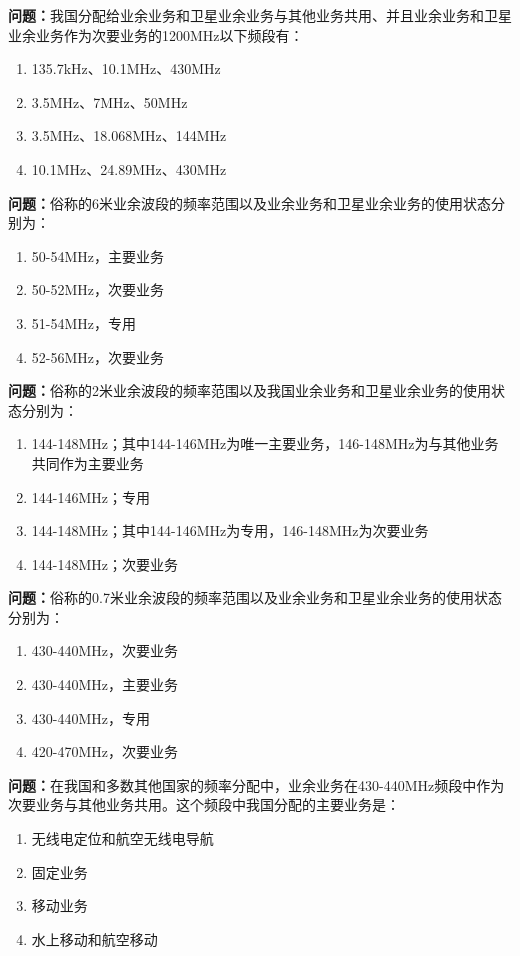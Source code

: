 \documentclass[UTF8]{ctexbook}
\begin{document}
\textbf{问题：}我国分配给业余业务和卫星业余业务与其他业务共用、并且业余业务和卫星业余业务作为次要业务的1200MHz以下频段有：
\begin{enumerate}[label=\Alph*), leftmargin=3em]
  \item 135.7kHz、10.1MHz、430MHz
  \item 3.5MHz、7MHz、50MHz
  \item 3.5MHz、18.068MHz、144MHz
  \item 10.1MHz、24.89MHz、430MHz
\end{enumerate}

\textbf{问题：}俗称的6米业余波段的频率范围以及业余业务和卫星业余业务的使用状态分别为：
\begin{enumerate}[label=\Alph*), leftmargin=3em]
  \item 50-54MHz，主要业务
  \item 50-52MHz，次要业务
  \item 51-54MHz，专用
  \item 52-56MHz，次要业务
\end{enumerate}

\textbf{问题：}俗称的2米业余波段的频率范围以及我国业余业务和卫星业余业务的使用状态分别为：
\begin{enumerate}[label=\Alph*), leftmargin=3em]
  \item 144-148MHz；其中144-146MHz为唯一主要业务，146-148MHz为与其他业务共同作为主要业务
  \item 144-146MHz；专用
  \item 144-148MHz；其中144-146MHz为专用，146-148MHz为次要业务
  \item 144-148MHz；次要业务
\end{enumerate}

\textbf{问题：}俗称的0.7米业余波段的频率范围以及业余业务和卫星业余业务的使用状态分别为：
\begin{enumerate}[label=\Alph*), leftmargin=3em]
  \item 430-440MHz，次要业务
  \item 430-440MHz，主要业务
  \item 430-440MHz，专用
  \item 420-470MHz，次要业务
\end{enumerate}

\textbf{问题：}在我国和多数其他国家的频率分配中，业余业务在430-440MHz频段中作为次要业务与其他业务共用。这个频段中我国分配的主要业务是：
\begin{enumerate}[label=\Alph*), leftmargin=3em]
  \item 无线电定位和航空无线电导航
  \item 固定业务
  \item 移动业务
  \item 水上移动和航空移动
\end{enumerate}
\end{document}

